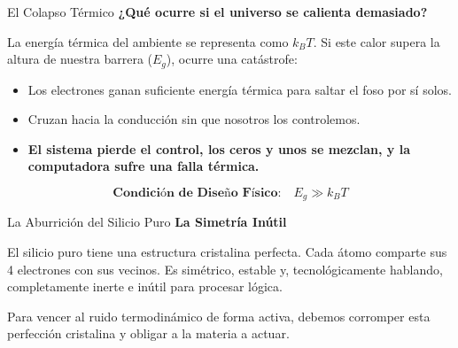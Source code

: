 \documentclass[10pt, aspectratio=169]{beamer}
\begin{document}
\begin{frame}{El Colapso Térmico}
    \vspace{0.4cm}
    \Large \textbf{¿Qué ocurre si el universo se calienta demasiado?}
    
    \vspace{0.4cm}
    \normalsize
    La energía térmica del ambiente se representa como $k_B T$. Si este calor supera la altura de nuestra barrera ($E_g$), ocurre una catástrofe:
    
    \vspace{0.4cm}
    \begin{itemize}
        \setlength\itemsep{0.3cm}
        \item Los electrones ganan suficiente energía térmica para saltar el foso por sí solos.
        \item Cruzan hacia la conducción sin que nosotros los controlemos.
        \item \alert{\textbf{El sistema pierde el control, los ceros y unos se mezclan, y la computadora sufre una falla térmica.}}
    \end{itemize}
    
    \vspace{0.2cm}
    $$\textbf{Condición de Diseño Físico:} \quad E_g \gg k_B T$$
\end{frame}


\begin{frame}{La Aburrición del Silicio Puro}
    \vspace{0.4cm}
    \Large \textbf{La Simetría Inútil}
    
    \vspace{0.6cm}
    \normalsize
    El silicio puro tiene una estructura cristalina perfecta. Cada átomo comparte sus 4 electrones con sus vecinos. Es simétrico, estable y, tecnológicamente hablando, completamente inerte e inútil para procesar lógica.
    
    \vspace{0.4cm}
    Para vencer al ruido termodinámico de forma activa, debemos corromper esta perfección cristalina y obligar a la materia a actuar.
\end{frame}
\end{document}
